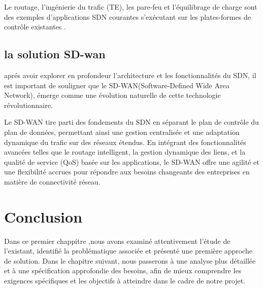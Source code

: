 Le routage, l'ingénierie du trafic (TE), les pare-feu et l'équilibrage de charge sont des exemples d'applications SDN courantes s'exécutant sur les plates-formes de contrôle existantes . 
\subsection{la solution SD-wan  }
aprés avoir explorer en profondeur l'architecture et les fonctionnalités du SDN, il est important de souligner que le SD-WAN(Software-Defined Wide Area Network), émerge comme une évolution naturelle de cette technologie révolutionnaire.

Le SD-WAN tire parti des fondements du SDN en séparant le plan de contrôle du plan de données, permettant ainsi une gestion centralisée et une adaptation dynamique du trafic sur des réseaux étendus. En intégrant des fonctionnalités avancées telles que le routage intelligent, la gestion dynamique des liens, et la qualité de service (QoS) basée sur les applications, le SD-WAN offre une agilité et une flexibilité accrues pour répondre aux besoins changeants des entreprises en matière de connectivité réseau.

\section*{Conclusion }

Dans ce premier chappitre ,nous avons examiné attentivement l'étude de l'existant, identifié la problématique associée et présenté une première approche de solution. Dans le chapitre suivant, nous passerons à une analyse plus détaillée et à une spécification approfondie des besoins, afin de mieux comprendre les exigences spécifiques et les objectifs à atteindre dans le cadre de notre projet.